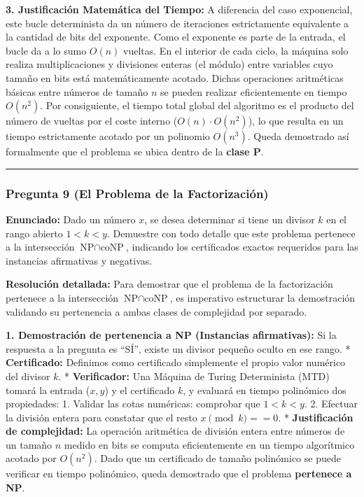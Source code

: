 \documentclass[12pt]{book} %
\begin{document}
\textbf{3. Justificación Matemática del Tiempo:} A diferencia del caso
exponencial, este bucle determinista da un número de iteraciones
estrictamente equivalente a la cantidad de bits del exponente. Como el
exponente es parte de la entrada, el bucle da a lo sumo \(O(n)\)
vueltas. En el interior de cada ciclo, la máquina solo realiza
multiplicaciones y divisiones enteras (el módulo) entre variables cuyo
tamaño en bits está matemáticamente acotado. Dichas operaciones
aritméticas básicas entre números de tamaño \(n\) se pueden realizar
eficientemente en tiempo \(O(n^2)\). Por consiguiente, el tiempo total
global del algoritmo es el producto del número de vueltas por el coste
interno (\(O(n) \cdot O(n^2)\)), lo que resulta en un tiempo
estrictamente acotado por un polinomio \textbf{\(O(n^3)\)}. Queda
demostrado así formalmente que el problema se ubica dentro de la
\textbf{clase P}.

\begin{center}\rule{0.5\linewidth}{0.5pt}\end{center}

\hypertarget{pregunta-9-el-problema-de-la-factorizaciuxf3n}{%
\subsubsection{Pregunta 9 (El Problema de la
Factorización)}\label{pregunta-9-el-problema-de-la-factorizaciuxf3n}}

\textbf{Enunciado:} Dado un número \(x\), se desea determinar si tiene
un divisor \(k\) en el rango abierto \(1 < k < y\). Demuestre con todo
detalle que este problema pertenece a la intersección
\(\text{NP} \cap \text{coNP}\), indicando los certificados exactos
requeridos para las instancias afirmativas y negativas.

\textbf{Resolución detallada:} Para demostrar que el problema de la
factorización pertenece a la intersección
\textbf{\(\text{NP} \cap \text{coNP}\)}, es imperativo estructurar la
demostración validando su pertenencia a ambas clases de complejidad por
separado.

\textbf{1. Demostración de pertenencia a NP (Instancias afirmativas):}
Si la respuesta a la pregunta es ``SÍ'', existe un divisor pequeño
oculto en ese rango. * \textbf{Certificado:} Definimos como certificado
simplemente el propio valor numérico del divisor \(k\). *
\textbf{Verificador:} Una Máquina de Turing Determinista (MTD) tomará la
entrada (\(x, y\)) y el certificado \(k\), y evaluará en tiempo
polinómico dos propiedades: 1. Validar las cotas numéricas: comprobar
que \(1 < k < y\). 2. Efectuar la división entera para constatar que el
resto \(x \pmod k == 0\). * \textbf{Justificación de complejidad:} La
operación aritmética de división entera entre números de un tamaño \(n\)
medido en bits se computa eficientemente en un tiempo algorítmico
acotado por \textbf{\(O(n^2)\)}. Dado que un certificado de tamaño
polinómico se puede verificar en tiempo polinómico, queda demostrado que
el problema \textbf{pertenece a NP}.
\end{document}
